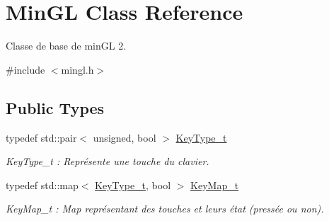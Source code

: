 \hypertarget{class_min_g_l}{}\section{Min\+GL Class Reference}
\label{class_min_g_l}


Classe de base de min\+GL 2.  




{\ttfamily \#include $<$mingl.\+h$>$}

\subsection*{Public Types}
\begin{DoxyCompactItemize}
\item 
typedef std\+::pair$<$ unsigned, bool $>$ \hyperlink{class_min_g_l_a6e612d21ed9723c37ad91093f7b48c96}{Key\+Type\+\_\+t}
\begin{DoxyCompactList}\small\item\em Key\+Type\+\_\+t \+: Représente une touche du clavier. \end{DoxyCompactList}\item 
typedef std\+::map$<$ \hyperlink{class_min_g_l_a6e612d21ed9723c37ad91093f7b48c96}{Key\+Type\+\_\+t}, bool $>$ \hyperlink{class_min_g_l_a084b1a739a671ad7d6af07792bd56af1}{Key\+Map\+\_\+t}
\begin{DoxyCompactList}\small\item\em Key\+Map\+\_\+t \+: Map représentant des touches et leurs état (pressée ou non). \end{DoxyCompactList}\end{DoxyCompactItemize}
